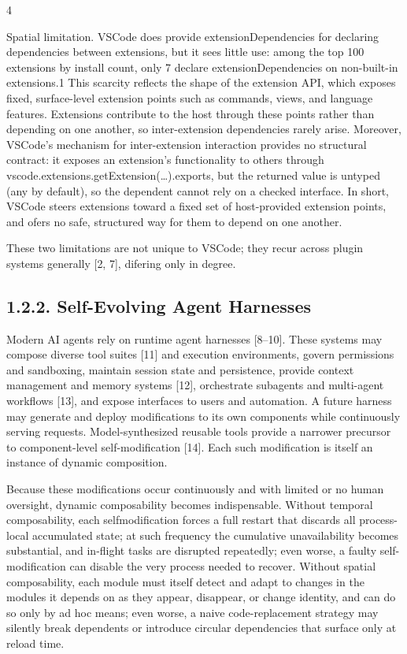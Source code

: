 \documentclass[
  10
]{article}
\begin{document}
4

Spatial limitation. VSCode does provide extensionDependencies for
declaring dependencies between extensions, but it sees little use: among
the top 100 extensions by install count, only 7 declare
extensionDependencies on non-built-in extensions.1 This scarcity
reflects the shape of the extension API, which exposes fixed,
surface-level extension points such as commands, views, and language
features. Extensions contribute to the host through these points rather
than depending on one another, so inter-extension dependencies rarely
arise. Moreover, VSCode's mechanism for inter-extension interaction
provides no structural contract: it exposes an extension's functionality
to others through vscode.extensions.getExtension(\ldots).exports, but
the returned value is untyped (any by default), so the dependent cannot
rely on a checked interface. In short, VSCode steers extensions toward a
fixed set of host-provided extension points, and ofers no safe,
structured way for them to depend on one another.

These two limitations are not unique to VSCode; they recur across plugin
systems generally {[}2, 7{]}, difering only in degree.

\subsection{1.2.2. Self-Evolving Agent
Harnesses}\label{self-evolving-agent-harnesses}

Modern AI agents rely on runtime agent harnesses {[}8--10{]}. These
systems may compose diverse tool suites {[}11{]} and execution
environments, govern permissions and sandboxing, maintain session state
and persistence, provide context management and memory systems {[}12{]},
orchestrate subagents and multi-agent workflows {[}13{]}, and expose
interfaces to users and automation. A future harness may generate and
deploy modifications to its own components while continuously serving
requests. Model-synthesized reusable tools provide a narrower precursor
to component-level self-modification {[}14{]}. Each such modification is
itself an instance of dynamic composition.

Because these modifications occur continuously and with limited or no
human oversight, dynamic composability becomes indispensable. Without
temporal composability, each selfmodification forces a full restart that
discards all process-local accumulated state; at such frequency the
cumulative unavailability becomes substantial, and in-flight tasks are
disrupted repeatedly; even worse, a faulty self-modification can disable
the very process needed to recover. Without spatial composability, each
module must itself detect and adapt to changes in the modules it depends
on as they appear, disappear, or change identity, and can do so only by
ad hoc means; even worse, a naive code-replacement strategy may silently
break dependents or introduce circular dependencies that surface only at
reload time.
\end{document}
